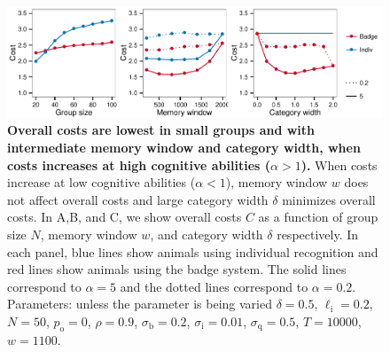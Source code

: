 \begin{figure}
\includegraphics[width=6.85in]{figures/costs.pdf}
\caption{\sffamily\small\textbf{Overall costs are lowest in small groups and with intermediate memory window and category width, when costs increases at high cognitive abilities ($\alpha>1$).} When costs increase at low cognitive abilities ($\alpha<1$), memory window $w$ does not affect overall costs and large category width $\delta$ minimizes overall costs. In A,B, and C, we show overall costs $C$ as a function of group size $N$, memory window $w$, and category width $\delta$ respectively. In each panel, blue lines show animals using individual recognition and red lines show animals using the badge system. The solid lines correspond to $\alpha=5$ and the dotted lines correspond to $\alpha=0.2$.  Parameters: unless the parameter is being varied $\delta = 0.5$, $\ell_\text{i}=0.2$, $N=50$, $p_\text{o}=0$, $\rho=0.9$, $\sigma_\text{b}=0.2$, $\sigma_\text{i}=0.01$, $\sigma_\text{q}=0.5$, $T=10000$, $w=1100$.}
\label{costs}
\end{figure}

